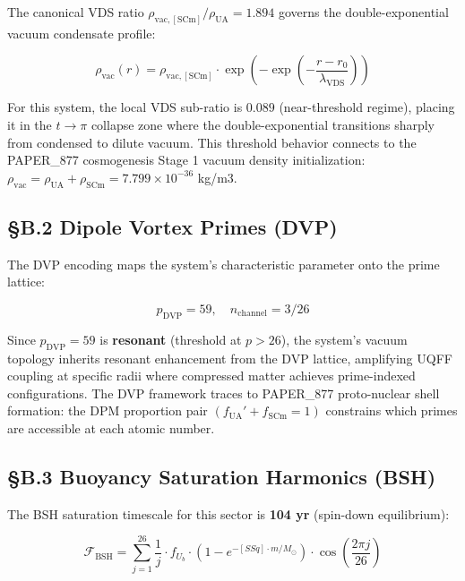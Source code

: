 \documentclass[12pt,a4paper]{article}
\begin{document}
The canonical VDS ratio $\rho_{\mathrm{vac,[SCm]}} / \rho_{\mathrm{UA}} = 1.894$ governs the double-exponential vacuum condensate profile:

\begin{equation}
\rho_{\mathrm{vac}}(r) = \rho_{\mathrm{vac,[SCm]}} \cdot \exp\!\left(-\exp\!\left(-\frac{r - r_0}{\lambda_{\mathrm{VDS}}}\right)\right)
\end{equation}

For this system, the local VDS sub-ratio is $0.089$ (near-threshold regime), placing it in the $t \to \pi$ collapse zone where the double-exponential transitions sharply from condensed to dilute vacuum. This threshold behavior connects to the PAPER\_877 cosmogenesis Stage 1 vacuum density initialization: $\rho_{\mathrm{vac}} = \rho_{\mathrm{UA}} + \rho_{\mathrm{SCm}} = 7.799 \times 10^{-36}$ kg/m3.

\subsection{\S{}B.2 Dipole Vortex Primes (DVP)}

The DVP encoding maps the system's characteristic parameter onto the prime lattice:

\begin{equation}
p_{\mathrm{DVP}} = 59, \quad n_{\mathrm{channel}} = 3/26
\end{equation}

Since $p_{\mathrm{DVP}} = 59$ is \textbf{resonant} (threshold at $p > 26$), the system's vacuum topology inherits resonant enhancement from the DVP lattice, amplifying UQFF coupling at specific radii where compressed matter achieves prime-indexed configurations. The DVP framework traces to PAPER\_877 proto-nuclear shell formation: the DPM proportion pair $(f_{\mathrm{UA}}' + f_{\mathrm{SCm}} = 1)$ constrains which primes are accessible at each atomic number.

\subsection{\S{}B.3 Buoyancy Saturation Harmonics (BSH)}

The BSH saturation timescale for this sector is \textbf{104 yr} (spin-down equilibrium):

\begin{equation}
\mathcal{F}_{\mathrm{BSH}} = \sum_{j=1}^{26} \frac{1}{j} \cdot f_U_b \cdot \left(1 - e^{-[SSq] \cdot m/M_\odot}\right) \cdot \cos\!\left(\frac{2\pi j}{26}\right)
\end{equation}
\end{document}
